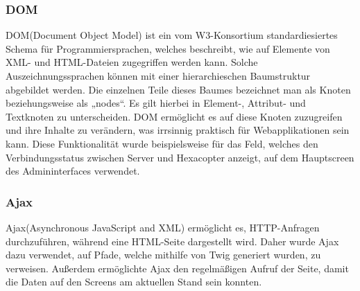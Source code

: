     \subsubsection{DOM}

DOM(Document Object Model) ist ein vom W3-Konsortium standardiesiertes Schema für Programmiersprachen, welches beschreibt, wie auf Elemente von XML- und HTML-Dateien zugegriffen werden kann. Solche Auszeichnungssprachen können mit einer hierarchieschen Baumstruktur abgebildet werden. Die einzelnen Teile dieses Baumes bezeichnet man als Knoten beziehungsweise als „nodes“.  Es gilt hierbei in Element-, Attribut- und Textknoten zu unterscheiden. DOM ermöglicht es auf diese Knoten zuzugreifen und ihre Inhalte zu verändern, was irrsinnig praktisch für Webapplikationen sein kann. Diese Funktionalität wurde beispielsweise für das Feld, welches den Verbindungsstatus zwischen Server und Hexacopter anzeigt, auf dem Hauptscreen des Admininterfaces verwendet.

    \subsubsection{Ajax}

Ajax(Asynchronous JavaScript and XML) ermöglicht es, HTTP-Anfragen durchzuführen, während eine HTML-Seite dargestellt wird. Daher wurde Ajax dazu verwendet, auf Pfade, welche mithilfe von Twig generiert wurden, zu verweisen. Außerdem ermöglichte Ajax den regelmäßigen Aufruf der Seite, damit die  Daten auf den Screens am aktuellen Stand sein konnten.

